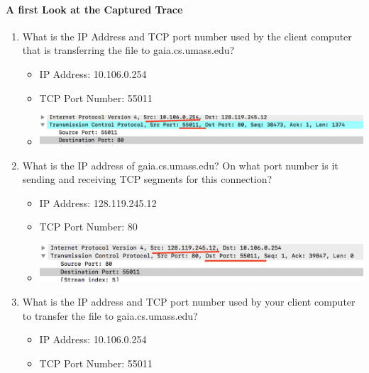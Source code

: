 \documentclass{article}
\begin{document}
\paragraph{A first Look at the Captured Trace}
  \begin{enumerate}
    \item What is the IP Address and TCP port number used by the client computer that is transferring the file to gaia.cs.umass.edu?
      \begin{itemize}
        \item IP Address: 10.106.0.254
        \item TCP Port Number: 55011
        \item \includegraphics[scale=0.5]{images/TCP1.png}
      \end{itemize}
    \item What is the IP address of gaia.cs.umass.edu?  On what port number is it sending and receiving TCP segments for this connection?
        \begin{itemize}
          \item IP Address: 128.119.245.12
          \item TCP Port Number: 80
          \item \includegraphics[scale=0.5]{images/TCP2.png}
        \end{itemize}

    \item What is the IP address and TCP port number used by your client computer to transfer the file to gaia.cs.umass.edu?
        \begin{itemize}
        \item IP Address: 10.106.0.254
        \item TCP Port Number: 55011
        \end{itemize}


\end{enumerate}
\end{document}
